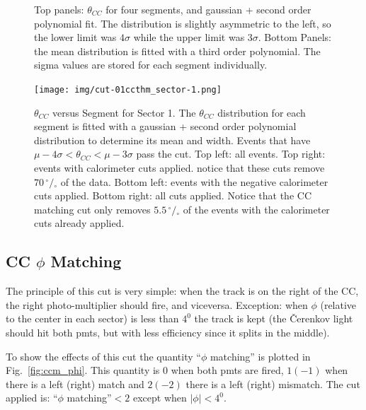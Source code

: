 \begin{figure}[h]
 		\label{fig:ccm_slices}
		\caption{Top panels: $\theta_{CC}$ for four segments, and gaussian + second order
					polynomial fit. The distribution is slightly asymmetric to the
               left, so the lower limit was $4\sigma$ while the upper limit
               was $3\sigma$.
               Bottom Panels: the mean distribution is fitted with a third order
               polynomial. The sigma values are stored for each segment individually. }
\end{figure}


\begin{figure}[h]
  \centering
		\texttt{[image: img/cut-01ccthm\_sector-1.png]}
		\caption{$\theta_{CC}$ versus Segment for Sector 1. The $\theta_{CC}$
               distribution for each segment is fitted with a gaussian +
               second order polynomial distribution to determine its mean
               and width. Events that have $\mu - 4\sigma < \theta_{CC} < \mu - 3\sigma$
               pass the cut.
               Top left: all events. Top right: events with calorimeter cuts applied.
               notice that these cuts remove $70 \,^{\circ\!\!}/\!_\circ$ of the data.
               Bottom left: events with the negative calorimeter cuts applied.
               Bottom right: all cuts applied. Notice that the CC matching cut
               only removes $5.5  \,^{\circ\!\!}/\!_\circ$ of the events with
               the calorimeter cuts already applied.}
 		\label{fig:ccm_theta}
\end{figure}

\clearpage\newpage

\subsection{CC $\phi$ Matching}
The principle of this cut is very simple: when the track is on the right of the CC, the right
photo-multiplier should fire, and viceversa. Exception: when $\phi$ (relative to the center
in each sector) is less than $4^0$ the track is kept (the \v Cerenkov light should hit both
pmts, but with less efficiency since it splits in the middle).

To show the effects of this cut the quantity ``$\phi$ matching'' is plotted in
Fig.~\ref{fig:ccm_phi}. This quantity is $0$ when both pmts are fired, $1(-1)$ when
there is a left (right) match and $2(-2)$ there is a left (right) mismatch.
The cut applied is:  ``$\phi$ matching''$<2$ except when $|\phi|<4^0$.


